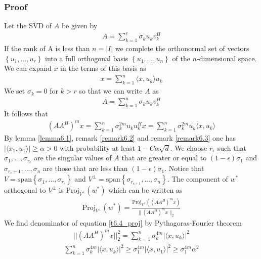 \documentclass[a4paper, english, headtopline=0.08em, headsepline=0.04em, left = 1cm, right = 1cm, DIV=15]{article}
\begin{document}
\subsubsection*{Proof}
Let the SVD of $A$ be given by
\begin{align*}
	A = \sum_{k=1}^r \sigma_k u_k v_k^H
\end{align*}
If the rank of A is less than $n=|I|$ we complete the orthonormal set of vectors $\left\{u_1,...,u_r\right\}$
into a full orthogonal basis $\left\{u_1,...,u_n\right\}$ of the $n$-dimensional space.
We can expand $x$ in the terms of this basis as
\begin{align*}
	x = \sum_{k=1}^n \langle x,u_k\rangle u_k
\end{align*}
We set $\sigma_k=0$ for $k>r$ so that we can write $A$ as
\begin{align*}
	A = \sum_{k=1}^n \sigma_k u_k v_k^H
\end{align*}
It follows that 
\begin{align*}
	(AA^H)^m x = \sum_{k=1}^n \sigma_k^{2m}u_ku_k^Hx = \sum_{k=1}^n \sigma_k^{2m}u_k\langle x,u_k\rangle
\end{align*}
By lemma \ref{lemma6.1}, remark \ref{remark6.2} and remark \ref{remark6.3} one 
has $|\langle x_1,u_1 \rangle| \geq  \alpha > 0$ with probability 
at least $1-C\alpha \sqrt{d}$.
We choose $r_{\epsilon}$ such that $\sigma_1,...,\sigma_{r_\epsilon}$ are the singular values of
$A$ that are greater or equal to $(1-\epsilon)\sigma_1$ and $\sigma_{r_{\epsilon}+1},...,\sigma_n$ are those 
that are less than $(1-\epsilon)\sigma_1$. Notice that $V = \text{span}\left\{\sigma_1,...,\sigma_{r_\epsilon}\right\}$ and
$V^\bot = \text{span}\left\{\sigma_{r_{\epsilon+1}},...,\sigma_{n}\right\}$.
The component of $w^*$ orthogonal to $V^\bot$ is $\text{Proj}_{V^{\bot }}(w^*)$ which can be written as
\begin{align}\label{t6.4_proj}
	\text{Proj}_{V^{\bot }}(w^*) = \frac{\text{Proj}_{V^{\bot}}\left( \left( AA^H\right)^m x \right)}{\|\left(AA^H\right)^m x\|_2}
\end{align}
We find  denominator of equation \ref{t6.4_proj} by Pythagoras-Fourier theorem
\begin{align} \label{t6.4_denom}
	||(AA^H)^m x||_2^2 = \sum_{k=1}^{n}\sigma_k^{4m} |\langle x,u_k\rangle|^2
\end{align}
\begin{align} \label{t6.4_denom_bound}
	\sum_{k=1}^{n}\sigma_k^{4m} |\langle x,u_k\rangle|^2 \geq
	\sigma_1^{4m}|\langle x,u_1\rangle|^2 \geq
	\sigma_1^{4m}\alpha^2 
\end{align}
\end{document}
